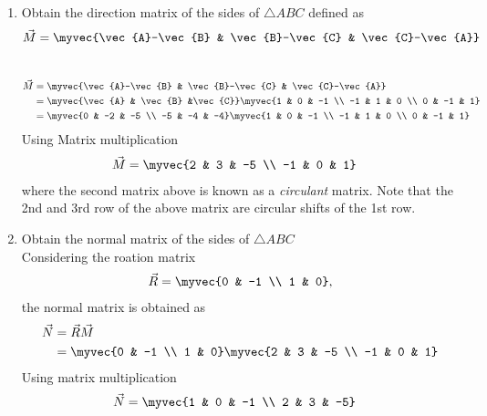 \documentclass[11pt]{book}
\begin{document}
\begin{enumerate}[label=\thesubsection.\arabic*.,ref=\thesubsection.\theenumi]
\item Obtain the direction matrix of the sides of $\triangle ABC$ defined as 
\begin{align}
\vec{M} = 	\myvec{\vec{A}-\vec{B} & \vec{B}-\vec{C} & \vec{C}-\vec{A}}
\end{align}
\\
\solution 
\begin{align}
\vec{M} &= \myvec{\vec{A}-\vec{B} & \vec{B}-\vec{C} & \vec{C}-\vec{A}} \\
	&= \myvec{\vec{A} & \vec{B} &\vec{C}} \myvec{1 & 0 & -1 \\ -1 & 1 & 0 \\ 0 & -1 & 1} \\
 &=\myvec{0 & -2 & -5 \\ -5 & -4 & -4}\myvec{1 & 0 & -1 \\ -1 & 1 & 0 \\ 0 & -1 & 1} 
 \end{align}
 Using Matrix multiplication
 \begin{align}
 \vec{M} &=\myvec{2 & 3 & -5 \\ -1 & 0 & 1}
\end{align}
where the second matrix above is known as a {\em circulant} matrix.  Note that the 2nd and 3rd row of the above matrix are circular shifts of the 1st row.

\item Obtain the normal matrix  of the sides of $\triangle ABC$ \\
\solution Considering the roation matrix
\begin{align}
\vec{R}  = \myvec{0 & -1 \\ 1 & 0},
\end{align}
the normal matrix is obtained as
\begin{align}
\vec{N} &= \vec{R}\vec{M}  \\
&=\myvec{0 & -1 \\ 1 & 0}\myvec{2 & 3 & -5 \\ -1 & 0 & 1} 
\end{align}
Using matrix multiplication 
\begin{align}
   \vec{N} &= \myvec{1 & 0 & -1 \\ 2 & 3 & -5}
\end{align}


\end{enumerate}
\end{document}
